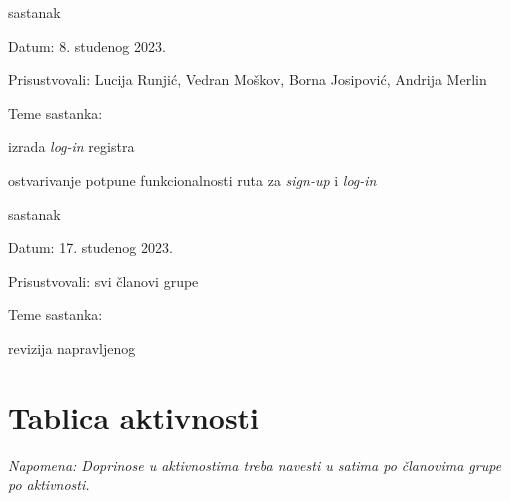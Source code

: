 \begin{packed_enum}
			\item sastanak
			
			\item[] \begin{packed_item}
				\item Datum: 8. studenog 2023.
				\item Prisustvovali: Lucija Runjić, Vedran Moškov, Borna Josipović, Andrija Merlin
				\item Teme sastanka:
				\begin{packed_item}
					\item izrada \textit{log-in} registra
					\item ostvarivanje potpune funkcionalnosti ruta za \textit{sign-up} i \textit{log-in}
				\end{packed_item}
			\end{packed_item}
			
			\item sastanak
			
			\item[] \begin{packed_item}
				\item Datum: 17. studenog 2023.
				\item Prisustvovali: svi članovi grupe
				\item Teme sastanka:
				\begin{packed_item}
					\item revizija napravljenog
				\end{packed_item}
			\end{packed_item}
		\end{packed_enum}
		
		
		
		\eject
		\section*{Tablica aktivnosti}
			
			 \textit{Napomena: Doprinose u aktivnostima treba navesti u satima po članovima grupe po aktivnosti.}

